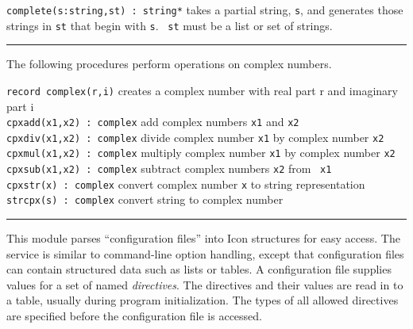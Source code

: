 \texttt{complete(s:string,st) : string*} takes
a partial string, \texttt{s}, and generates those strings in
\texttt{st} that begin with \texttt{s}. \ \texttt{st} must be a list or
set of strings. %


\vspace{0.25cm}\hrule{}

The following procedures perform operations on complex numbers. 

\noindent \texttt{record complex(r,i)} creates a complex number with real part r
and imaginary part i\\
\texttt{cpxadd(x1,x2) : complex} add complex numbers \texttt{x1} and
\texttt{x2}\\
\texttt{cpxdiv(x1,x2) : complex} divide complex number \texttt{x1} by
complex number \texttt{x2}\\
\texttt{cpxmul(x1,x2) : complex} multiply complex number \texttt{x1} by
complex number \texttt{x2}\\
\texttt{cpxsub(x1,x2) : complex} subtract complex numbers \texttt{x2}
from \ \texttt{x1}\\
\texttt{cpxstr(x) : complex} convert complex number \texttt{x} to string
representation\\
\texttt{strcpx(s) : complex} convert string to complex number 

\vspace{0.25cm}\hrule{}

This module parses ``configuration files'' into Icon
structures for easy access. The service is similar to 
command-line option handling, except that configuration files can
contain structured data such as lists or tables. A configuration file
supplies values for a set of named \textit{directives}. The directives
and their values are read in to a table, usually during program
initialization. The types of all allowed directives are specified
before the configuration file is accessed.

